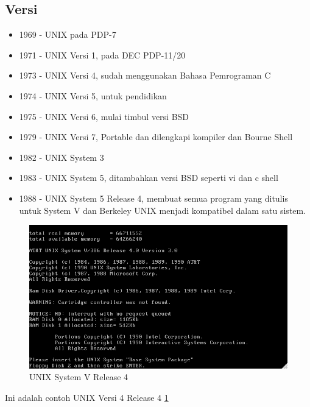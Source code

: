 		\subsection{Versi}
		\begin{itemize}
			\item 1969 - UNIX pada PDP-7
			\item 1971 - UNIX Versi 1, pada DEC PDP-11/20
			\item 1973 - UNIX Versi 4, sudah menggunakan Bahasa Pemrograman C
			\item 1974 - UNIX Versi 5, untuk pendidikan
			\item 1975 - UNIX Versi 6, mulai timbul versi BSD
			\item 1979 - UNIX Versi 7, Portable dan dilengkapi kompiler dan Bourne Shell
			\item 1982 - UNIX System 3
			\item 1983 - UNIX System 5, ditambahkan versi BSD seperti vi dan c shell
			\item 1988 - UNIX System 5 Release 4, membuat semua program yang ditulis untuk System V dan Berkeley UNIX menjadi kompatibel dalam satu sistem.
		\end{itemize}
			\begin{figure}[ht]
			\centerline{\includegraphics[width=1\textwidth]{figures/UNIXSVR4.png}}
			\caption{UNIX System V Release 4}
			\label{UNIXSVR4}
			\end{figure}
		Ini adalah contoh UNIX Versi 4 Release 4 \ref{UNIXSVR4}
		
